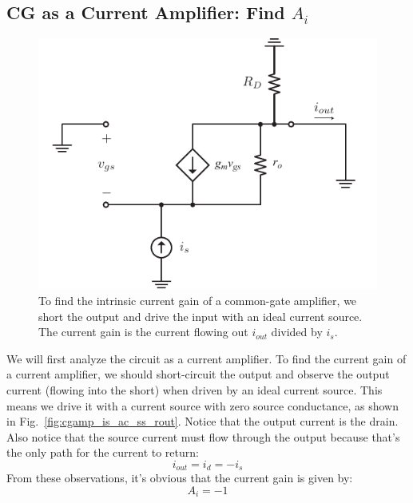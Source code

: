 \subsection{CG as a Current Amplifier\texorpdfstring{: Find $A_{i}$}{}}
\begin{figure}[tb]
\centering
\includegraphics[scale=.9]{cgamp_is_ac_ss_short}
\caption{To find the intrinsic current gain of a common-gate amplifier, we short the output and drive the input with an ideal current source.  The current gain is the current flowing out $i_{out}$ divided by $i_s$.}
\label{fig:cgamp_is_ac_ss_short}
\end{figure}
We will first analyze the circuit as a current amplifier.  To find the current gain of a current amplifier, we should short-circuit the output and observe the output current (flowing into the short) when driven by an ideal current source.  This means we drive it with a current source with zero source conductance, as shown in Fig.~\ref{fig:cgamp_is_ac_ss_rout}.  Notice that the output current is the drain.  Also notice that the source current must flow through the output because that's the only path for the current to return:
    \begin{equation}
        {i_{out}} = {i_d} =  - {i_s}
    \end{equation}
From these observations, it's obvious that the current gain is given by:
    \begin{equation}
        {A_i} =  - 1
    \end{equation}
